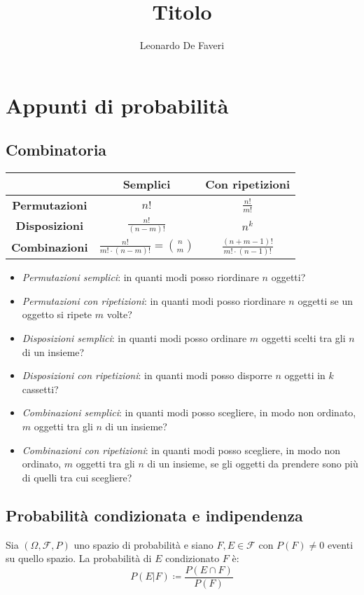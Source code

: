 \documentclass[12pt, a4paper]{report}
\title{Titolo}
\author{Leonardo De Faveri}
\date{}
\theoremstyle{definition}
\begin{document}
\chapter{Appunti di probabilità}
\section{Combinatoria}
\begin{center}
    \renewcommand{\arraystretch}{1.5}
    \begin{tabular}{|c|c|c|}
        \hline
        & \textbf{Semplici} & \textbf{Con ripetizioni}\\
        \hline
        \textbf{Permutazioni} & $n!$ & $\frac{n!}{m!}$\\
        \textbf{Disposizioni} & $\frac{n!}{(n-m)!}$ & $n^k$\\
        \textbf{Combinazioni} & $\frac{n!}{m!\cdot(n-m)!}=\binom{n}{m}$ &
        $\frac{(n+m-1)!}{m!\cdot(n-1)!}$\\
        \hline
    \end{tabular}
\end{center}
\begin{itemize}
    \item \emph{Permutazioni semplici}: in quanti modi posso riordinare $n$ oggetti?
    \item \emph{Permutazioni con ripetizioni}: in quanti modi posso riordinare $n$
    oggetti se un oggetto si ripete $m$ volte?
    \item \emph{Disposizioni semplici}: in quanti modi posso ordinare $m$ oggetti
    scelti tra gli $n$ di un insieme?
    \item \emph{Disposizioni con ripetizioni}: in quanti modi posso disporre $n$
    oggetti in $k$ cassetti?
    \item \emph{Combinazioni semplici}: in quanti modi posso scegliere, in modo non
    ordinato, $m$ oggetti tra gli $n$ di un insieme?
    \item \emph{Combinazioni con ripetizioni}: in quanti modi posso scegliere,
    in modo non ordinato, $m$ oggetti tra gli $n$ di un insieme, se gli oggetti
    da prendere sono più di quelli tra cui scegliere?
\end{itemize}

\section{Probabilità condizionata e indipendenza}
Sia $(\Omega, \mathcal{F}, P)$ uno spazio di probabilità e siano $F,E\in\mathcal{F}$
con $P(F)\neq0$ eventi su quello spazio. La probabilità di $E$ condizionato $F$ è:
\[P(E|F)\coloneqq\frac{P(E\cap F)}{P(F)}\]
\end{document}
